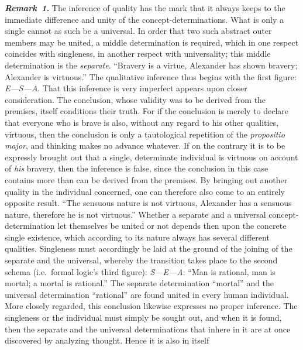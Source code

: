 \documentclass[12pt]{book}
\newcommand{\anm}[1]{\emph{\textbf{Remark~#1.}}}
\begin{document}
\anm{1} The inference of quality has the mark that it always keeps to the
immediate difference and unity of the concept-determinations. What is only a
single cannot as such be a universal. In order that two such abstract outer
members may be united, a middle determination is required, which in one
respect coincides with singleness, in another respect with universality;
this middle determination is the \emph{separate}. ``Bravery is a virtue,
Alexander has shown bravery; Alexander is virtuous.'' The qualitative
inference thus begins with the first figure: \textit{E---S---A}. That this
inference is very imperfect appears upon closer consideration. The
conclusion, whose validity was to be derived from the premises, itself
conditions their truth. For if the conclusion is merely to declare that
everyone who is brave is also, without any regard to his other qualities,
virtuous, then the conclusion is only a tautological repetition of the
\textit{propositio major}, and thinking makes no advance whatever. If on the
contrary it is to be expressly brought out that a single, determinate
individual is virtuous on account of \emph{his} bravery, then the inference
is false, since the conclusion in this case contains more than can be
derived from the premises. By bringing out another quality in the individual
concerned, one can therefore also come to an entirely opposite result.
``The sensuous nature is not virtuous, Alexander has a sensuous nature,
therefore he is not virtuous.'' Whether a separate and a universal
concept-determination let themselves be united or not depends then upon the
concrete single existence, which according to its nature always has several
different qualities. Singleness must accordingly be laid at the ground of
the joining of the separate and the universal, whereby the transition takes
place to the second schema (i.e.\ formal logic's third figure):
\textit{S---E---A}: ``Man is rational, man is mortal; a mortal is
rational.'' The separate determination ``mortal'' and the universal
determination ``rational'' are found united in every human individual. More
closely regarded, this conclusion likewise expresses no proper inference.
The singleness or the individual must simply be sought out, and when it is
found, then the separate and the universal determinations that inhere in it
are at once discovered by analyzing thought. Hence it is also in itself
\end{document}
